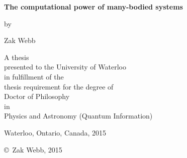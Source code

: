

\pagestyle{empty}

\begin{titlepage}
        \begin{center}
        \vspace*{1.0cm}

        \Huge
        {\bf The computational power of many-bodied systems}

        \vspace*{1.0cm}

        \normalsize
        by \\

        \vspace*{1.0cm}

        \Large
        Zak Webb \\

        \vspace*{3.0cm}

        \normalsize
        A thesis \\
        presented to the University of Waterloo \\ 
        in fulfillment of the \\
        thesis requirement for the degree of \\
        Doctor of Philosophy \\
        in \\
        Physics and Astronomy (Quantum Information) \\

        \vspace*{2.0cm}

        Waterloo, Ontario, Canada, 2015 \\

        \vspace*{1.0cm}

        \copyright\ Zak Webb, 2015 \\
        \end{center}
\end{titlepage}

